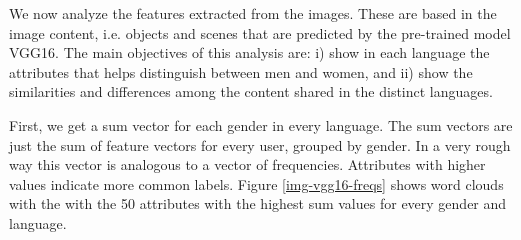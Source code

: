 \documentclass[runningheads]{llncs}
\begin{document}
We now analyze the features extracted from the images. These
are based in the image content, i.e. objects and scenes that
are predicted by the pre-trained model VGG16.
The main objectives of this analysis are: i) show in each language the attributes that helps distinguish between men and women, and ii) show the similarities
and differences among the content shared in the distinct languages.

First, we get a sum vector for each gender in every language.
The sum vectors are just the sum of feature vectors for 
every user, grouped by gender. In a very rough way
this vector is  analogous to a vector of frequencies.
Attributes with higher values indicate more common labels.
Figure \ref{img-vgg16-freqs} shows word clouds with the 
with the 50 attributes with the highest sum values for every gender and language.
\end{document}
